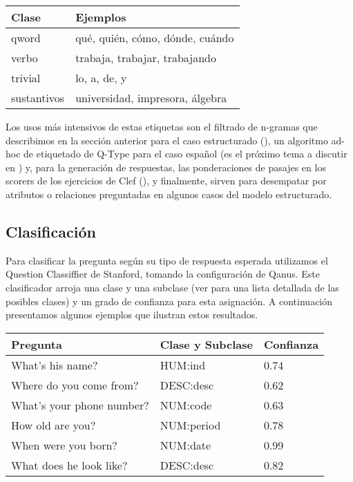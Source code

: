 \begin{center}
\begin{tabular}{| l | l |}
\hline
Clase & Ejemplos\\ \hline
qword  & qué, quién, cómo, dónde, cuándo\\ \hline
verbo & trabaja, trabajar, trabajando \\ \hline
trivial  & lo, a, de, y \\ \hline
sustantivos  & universidad, impresora, álgebra \\ \hline
\end{tabular}
\end{center}

Los usos más intensivos de estas etiquetas son el filtrado de n-gramas que describimos en la sección anterior para el caso estructurado (), un algoritmo ad-hoc de etiquetado de Q-Type para el caso español (es el próximo tema a discutir en ) y, para la generación de respuestas, las ponderaciones de pasajes en los scorers de los ejercicios de Clef (), y finalmente, sirven para desempatar por atributos o relaciones preguntadas en algunos casos del modelo estructurado.

\subsection{Clasificación}
\label{subsec:qtype}
Para clasificar la pregunta según su tipo de respuesta esperada utilizamos el Question Classiffier de Stanford, tomando la configuración de Qanus. Este clasificador arroja una clase y una subclase (ver  para una lista detallada de las posibles clases) y un grado de confianza para esta asignación. A continuación presentamos algunos ejemplos que ilustran estos resultados.

\begin{center}
\begin{tabular}{| l | l | l |}
\hline
Pregunta & Clase y Subclase & Confianza\\ \hline 
What's his name? & HUM:ind & 0.74 \\ \hline 
Where do you come from? & DESC:desc & 0.62 \\ \hline 
What's your phone number? & NUM:code & 0.63 \\ \hline 
How old are you? & NUM:period & 0.78 \\ \hline 
When were you born? & NUM:date & 0.99 \\ \hline 
What does he look like? & DESC:desc & 0.82 \\ \hline 
\end{tabular}
\end{center}

